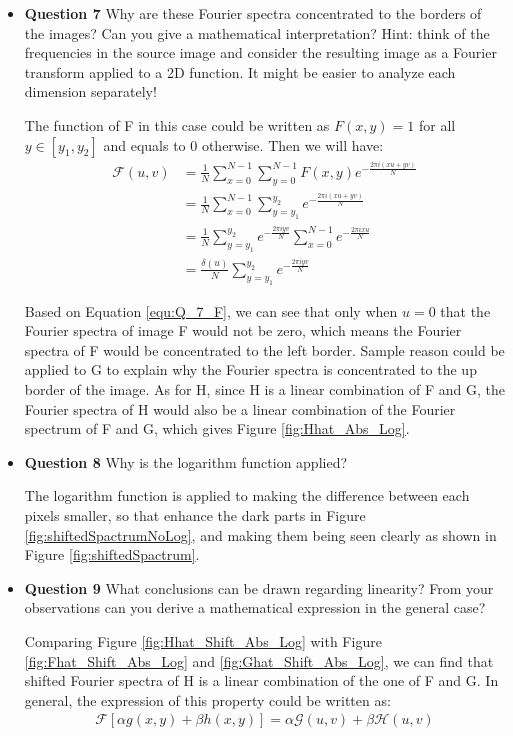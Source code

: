 \documentclass[11pt,a4paper]{article}
\begin{document}
\begin{itemize}
	\item \textbf{Question 7} Why are these Fourier spectra concentrated to the borders of the images? Can you give a mathematical interpretation? Hint: think of the frequencies in the source image and consider the resulting image as a Fourier transform applied to a 2D function. It might be easier to analyze each dimension separately!
	\par The function of F in this case could be written as $F(x, y) = 1$ for all $y \in \left[y_{1}, y_{2}\right]$ and equals to $0$ otherwise. Then we will have:
	\begin{align}
		\mathcal{F}(u, v) &= \frac{1}{N}\sum_{x=0}^{N-1}\sum_{y=0}^{N-1}F(x,y)e^{-\frac{2\pi i(xu+yv)}{N}} \\
		&= \frac{1}{N}\sum_{x=0}^{N-1}\sum_{y=y_{1}}^{y_{2}}e^{-\frac{2\pi i(xu+yv)}{N}} \\
		&= \frac{1}{N}\sum_{y=y_{1}}^{y_{2}}e^{-\frac{2\pi iyv}{N}}\sum_{x=0}^{N-1}e^{-\frac{2\pi ixu}{N}} \\
		&= \frac{\delta(u)}{N}\sum_{y=y_{1}}^{y_{2}}e^{-\frac{2\pi iyv}{N}} \label{equ:Q_7_F}
	\end{align}
	\par Based on Equation \ref{equ:Q_7_F}, we can see that only when $u=0$ that the Fourier spectra of image F would not be zero, which means the Fourier spectra of F would be concentrated to the left border. Sample reason could be applied to G to explain why the Fourier spectra is concentrated to the up border of the image. As for H, since H is a linear combination of F and G, the Fourier spectra of H would also be a linear combination of the Fourier spectrum of F and G, which gives Figure \ref{fig:Hhat_Abs_Log}.
	
	\item \textbf{Question 8} Why is the logarithm function applied?
	\par The logarithm function is applied to making the difference between each pixels smaller, so that enhance the dark parts in Figure \ref{fig:shiftedSpactrumNoLog}, and making them being seen clearly as shown in Figure \ref{fig:shiftedSpactrum}.
	
	\item \textbf{Question 9} What conclusions can be drawn regarding linearity? From your observations can you derive a mathematical expression in the general case?
	\par Comparing Figure \ref{fig:Hhat_Shift_Abs_Log} with Figure \ref{fig:Fhat_Shift_Abs_Log} and \ref{fig:Ghat_Shift_Abs_Log}, we can find that shifted Fourier spectra of H is a linear combination of the one of F and G. In general, the expression of this property could be written as:
	\begin{align}
		\mathcal{F}[\alpha g(x, y) + \beta h(x, y)] = \alpha \mathcal{G}(u, v) + \beta \mathcal{H}(u, v) \label{equ:linearity}
	\end{align}
\end{itemize}
\end{document}

